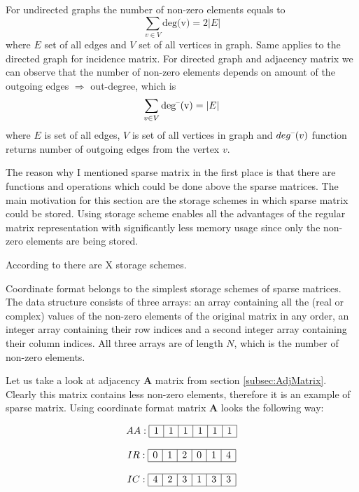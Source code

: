 \documentclass[thesis=M,english]{FITthesis}[2012/10/20]
\begin{document}
For undirected graphs the number of non-zero elements equals to $$ \sum_{v \in V} \textrm{deg(v)} = 2|E| $$ where $E$ set of all edges and $V$ set of all vertices in graph. Same applies to the directed graph for incidence matrix. For directed graph and adjacency matrix we can observe that the number of non-zero elements depends on amount of the outgoing edges $\Rightarrow$ out-degree, which is 
$$ \sum_{v \in V} \textrm{deg\textsuperscript{--}(v)} = |E| $$ where $E$ is set of all edges, $V$ is set of all vertices in graph and $deg\textsuperscript{--}(v)$ function returns number of outgoing edges from the vertex $v$.

The reason why I mentioned sparse matrix in the first place is that there are functions and operations which could be done above the sparse matrices. The main motivation for this section are the storage schemes in which sparse matrix could be stored. Using storage scheme enables all the advantages of the regular matrix representation with significantly less memory usage since only the non-zero elements are being stored.

According to \cite{Saad03} there are X storage schemes. 

Coordinate format belongs to the simplest storage schemes of sparse matrices. The data structure consists of three arrays: an array containing all the (real or complex) values of the non-zero elements of the original matrix in any order, an integer array containing their row indices and a second integer array containing their column indices. All three arrays are of length $N$, which is the number of non-zero elements.

Let us take a look at adjacency $\textbf{A}$ matrix from section \ref{subsec:AdjMatrix}. Clearly this matrix contains less non-zero elements, therefore it is an example of sparse matrix. Using coordinate format matrix $\textbf{A}$ looks the following way:

$$
\begin{array}{c}

AA:
\begin{array}{|c|c|c|c|c|c|}
 \hline
 1 & 1 & 1 & 1 & 1 & 1 \\
 \hline
\end{array}
\\ \\
IR:
\begin{array}{|c|c|c|c|c|c|}
 \hline
 0 & 1 & 2 & 0 & 1 & 4 \\
 \hline
\end{array}
\\ \\
IC:
\begin{array}{|c|c|c|c|c|c|}
 \hline
 4 & 2 & 3 & 1 & 3 & 3 \\
 \hline
\end{array}
\end{array}
$$
\end{document}
